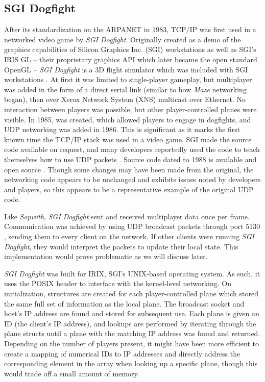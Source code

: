 \label{subsec:sgidogfight}

\subsection{SGI Dogfight}

After its standardization on the ARPANET in 1983, TCP/IP was first used in a networked video game by \textit{SGI Dogfight}. Originally created as a demo of the graphics capabilities of Silicon Graphics Inc. (SGI) workstations as well as SGI's IRIS GL -- their proprietary graphics API which later became the open standard OpenGL -- \textit{SGI Dogfight} is a 3D flight simulator which was included with SGI workstations \cite{zyda}. At first it was limited to single-player gameplay, but multiplayer was added in the form of a direct serial link (similar to how \textit{Maze} networking began), then over Xerox Network System (XNS) multicast over Ethernet. No interaction between players was possible, but other player-controlled planes were visible. In 1985,  was created, which allowed players to engage in dogfights, and UDP networking was added in 1986. This is significant as it marks the first known time the TCP/IP stack was used in a video game. SGI made the source code available on request, and many developers reportedly used the code to teach themselves how to use UDP packets \cite{zyda}. Source code dated to 1988 is available and open source \cite{dogsrc}. Though some changes may have been made from the original, the networking code appears to be unchanged and exhibits issues noted by developers and players, so this appears to be a representative example of the original UDP code.

Like \textit{Sopwith}, \textit{SGI Dogfight} sent and received multiplayer data once per frame. Communication was achieved by using UDP broadcast packets through port $5130$, sending them to every client on the network. If other clients were running \textit{SGI Dogfight}, they would interpret the packets to update their local state. This implementation would prove problematic as we will discuss later.

\textit{SGI Dogfight} was built for IRIX, SGI's UNIX-based operating system. As such, it uses the  POSIX header to interface with the kernel-level networking.
On initialization, structures are created for each player-controlled plane which stored the same full set of information as the local plane. The broadcast socket and host's IP address are found and stored for subsequent use. Each plane is given an ID (the client's IP address), and lookups are performed by iterating through the plane structs until a plane with the matching IP address was found and returned. Depending on the number of players present, it might have been more efficient to create a mapping of numerical IDs to IP addresses and directly address the corresponding element in the array when looking up a specific plane, though this would trade off a small amount of memory.

